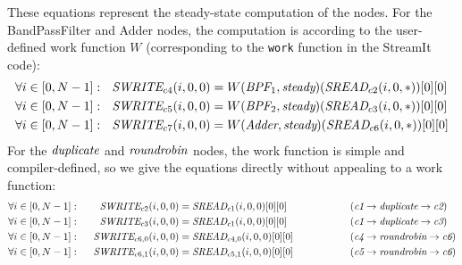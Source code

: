 These equations represent the steady-state computation of the nodes.
For the BandPassFilter and Adder nodes, the computation is according
to the user-defined work function $W$ (corresponding to the {\tt work}
function in the StreamIt code):
\begin{align*}
\forall i \in [0, N-1]:~~\mbox{\it SWRITE}_{c4}(i,0,0) &= W(\mbox{\it BPF}_1, \mbox{\it steady})(\mbox{\it SREAD}_{c2}(i, 0, *))[0][0] \\
\forall i \in [0, N-1]:~~\mbox{\it SWRITE}_{c5}(i,0,0) &= W(\mbox{\it BPF}_2, \mbox{\it steady})(\mbox{\it SREAD}_{c3}(i, 0, *))[0][0] \\
\forall i \in [0, N-1]:~~\mbox{\it SWRITE}_{c7}(i,0,0) &= W(\mbox{\it Adder}, \mbox{\it steady})(\mbox{\it SREAD}_{c6}(i, 0, *))[0][0]
\end{align*}
For the $\mbox{\it duplicate}$ and $\mbox{\it roundrobin}$ nodes, the work
function is simple and compiler-defined, so we give the equations
directly without appealing to a work function:
\begin{align*}
\forall i \in [0, N-1]:&& ~~\mbox{\it SWRITE}_{c2}(i,0,0) &= \mbox{\it SREAD}_{c1}(i, 0, 0)[0][0] &&~~~~~~~~~~~~~~ (\mbox{\it c1} \rightarrow \mbox{\it duplicate} \rightarrow \mbox{\it c2}) \\
\forall i \in [0, N-1]:&& ~~\mbox{\it SWRITE}_{c3}(i,0,0) &= \mbox{\it SREAD}_{c1}(i, 0, 0)[0][0] &&~~~~~~~~~~~~~~ (\mbox{\it c1} \rightarrow \mbox{\it duplicate} \rightarrow \mbox{\it c3}) \\
\forall i \in [0, N-1]:&& ~~\mbox{\it SWRITE}_{{c6}, 0}(i,0,0) &= \mbox{\it SREAD}_{{c4}, 0}(i, 0, 0)[0][0]  &&~~~~~~~~~~~~~~ (\mbox{\it c4} \rightarrow \mbox{\it roundrobin} \rightarrow \mbox{\it c6}) \\
\forall i \in [0, N-1]:&& ~~\mbox{\it SWRITE}_{{c6}, 1}(i,0,0) &= \mbox{\it SREAD}_{{c5}, 1}(i, 0, 0)[0][0] &&~~~~~~~~~~~~~~ (\mbox{\it c5} \rightarrow \mbox{\it roundrobin} \rightarrow \mbox{\it c6}) 
\end{align*}

\newpage
{}

